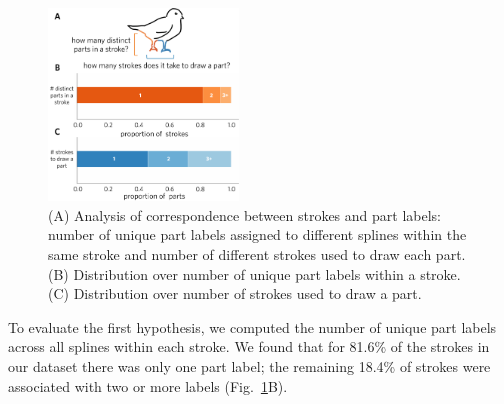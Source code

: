 \documentclass[10pt,letterpaper]{article}
\begin{document}
\begin{figure}[htbp]
\centering
\includegraphics[width=0.45\textwidth]{figures/5_stroke_part_relationship.pdf}
\caption{(A) Analysis of correspondence between strokes and part labels: number of unique part labels assigned to different splines within the same stroke and number of different strokes used to draw each part. (B) Distribution over number of unique part labels within a stroke. (C) Distribution over number of strokes used to draw a part.}
\label{stroke_to_part}
\end{figure}

To evaluate the first hypothesis, we computed the number of unique part labels across all splines within each stroke. 
We found that for 81.6\% of the strokes in our dataset there was only one part label; the remaining 18.4\% of strokes were associated with two or more labels  (Fig.~\ref{stroke_to_part}B).

\end{document}
